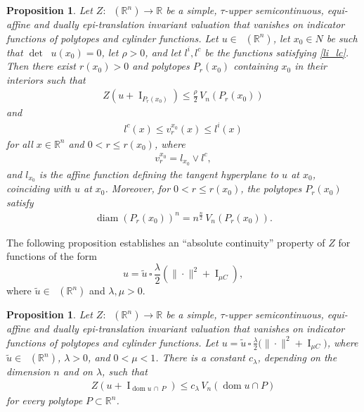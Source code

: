 \documentclass[11pt]{article}
\newtheorem{prop}[teo]{Proposition}
\theoremstyle{definition} %
\newcommand{\RR}{(\mathbb{R}^n)}
\DeclareMathOperator{\I}{I}
\DeclareMathOperator{\dom}{dom}
\DeclareMathOperator{\D}{D^2}
\DeclareMathOperator{\LP}{Conv_{lp}}
\DeclareMathOperator{\diam}{diam}
\begin{document}
\begin{prop}\label{regular2}
Let $Z:\LP\RR\rightarrow\mathbb{R}$ be a simple, $\tau$-upper semicontinuous, equi-affine and  dually epi-translation   invariant valuation that   vanishes on  indicator functions of polytopes and cylinder functions. Let $u \in \LP(\mathbb{R}^n)$,
let $x_0\in N$ be such that $\det \D u(x_0)=0$,  let $\rho>0$, and let $l^i, l^c$  be the functions satisfying \eqref{li_lc}. Then there exist $r(x_0)>0$ and   polytopes $P_r(x_0)$ containing $x_0$ in their interiors  such that
\begin{align}\label{eq10.67}
  Z(u+\I_{P_r(x_0)})\leq \frac{\rho}{2}\, V_n(P_r(x_0))
\end{align}
and
\begin{align}\label{eq10.66}
 l^c(x)\leq v_r^{x_0}(x)\leq l^i(x)    
\end{align}
for all  $x\in \mathbb{R}^n$ and $0<r\leq r(x_0)$, where
\begin{align}\label{eq41112}
  v_r^{x_0}= l_{x_0}\vee l^c,  
\end{align}
and $l_{x_0}$ is the affine function defining the tangent hyperplane to $u$ at $x_0$, coinciding with $u$ at $x_0$. Moreover, for $0<r\leq r(x_0)$, the 
polytopes $P_r(x_0)$ satisfy 
\begin{align}\label{eq10.53..}
\diam(P_r(x_0))^n= n^{\frac{n}{2}}\, V_n(P_r(x_0)).    
\end{align}
\end{prop}



The following proposition establishes an ``absolute continuity'' property of $Z$ for functions of the form
\[
u=\tilde{u}\,\square\,\frac{\lambda}{2}(\|\cdot\|^2+\I_{\mu C}),
\]
where $\tilde{u}\in\LP(\mathbb{R}^n)$ and $\lambda,\mu>0$. 


\begin{prop}\label{singular}
Let $Z:\LP\RR\rightarrow\mathbb{R}$ be a simple, $\tau$-upper semicontinuous, equi-affine and  dually epi-translation   invariant valuation that   vanishes on  indicator functions of polytopes and cylinder functions. Let $u = \tilde{u}\,\square\, \frac{\lambda}{2}\big(\|\cdot\|^2+\I_{\mu C}\big)$, where $\tilde{u}\in \LP(\mathbb{R}^n)$,  $ \lambda>0$, and $0<\mu<1$.   There is a constant $c_{\lambda}$, depending on the dimension $n$ and on $\lambda$, such that
\begin{align*}
    Z(u+\I_{\dom u \, \cap \,P})\leq c_{\lambda}\, V_n(\dom u\cap P) 
\end{align*}
for every polytope $P\subset \mathbb{R}^n$.
\end{prop}
\end{document}
